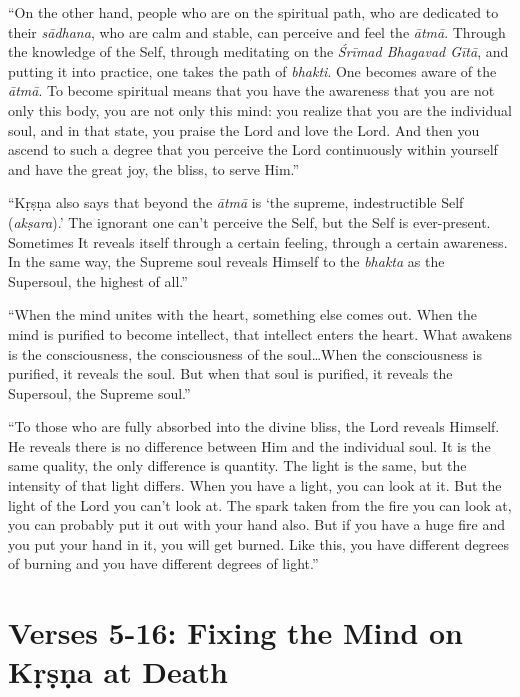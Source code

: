 \documentclass[12pt, twoside, openright]{memoir}
\begin{document}
\enquote{On the other hand, people who are on the spiritual path, who are dedicated to their \textit{sādhana}, who are calm and stable, can perceive and feel the \textit{ātmā}. Through the knowledge of the Self, through meditating on the \textit{Śrīmad Bhagavad Gītā}, and putting it into practice, one takes the path of \textit{bhakti}. One becomes aware of the \textit{ātmā}. To become spiritual means that you have the awareness that you are not only this body, you are not only this mind: you realize that you are the individual soul, and in that state, you praise the Lord and love the Lord. And then you ascend to such a degree that you perceive the Lord continuously within yourself and have the great joy, the bliss, to serve Him.}

\enquote{Kṛṣṇa also says that beyond the \textit{ātmā} is \enquote{the supreme, indestructible Self (\textit{akṣara}).} The ignorant one can’t perceive the Self, but the Self is ever-present. Sometimes It reveals itself through a certain feeling, through a certain awareness. In the same way, the Supreme soul reveals Himself to the \textit{bhakta} as the Supersoul, the highest of all.}

\enquote{When the mind unites with the heart, something else comes out. When the mind is purified to become intellect, that intellect enters the heart. What awakens is the consciousness, the consciousness of the soul\ldots When the consciousness is purified, it reveals the soul. But when that soul is purified, it reveals the Supersoul, the Supreme soul.}

\enquote{To those who are fully absorbed into the divine bliss, the Lord reveals Himself. He reveals there is no difference between Him and the individual soul. It is the same quality, the only difference is quantity. The light is the same, but the intensity of that light differs. When you have a light, you can look at it. But the light of the Lord you can’t look at. The spark taken from the fire you can look at, you can probably put it out with your hand also. But if you have a huge fire and you put your hand in it, you will get burned. Like this, you have different degrees of burning and you have different degrees of light.}

\section{Verses 5-16: Fixing the Mind on Kṛṣṇa at Death}\label{sec-verses-5-16-fixing-the-mind-on-krsna-at-death}
\end{document}
